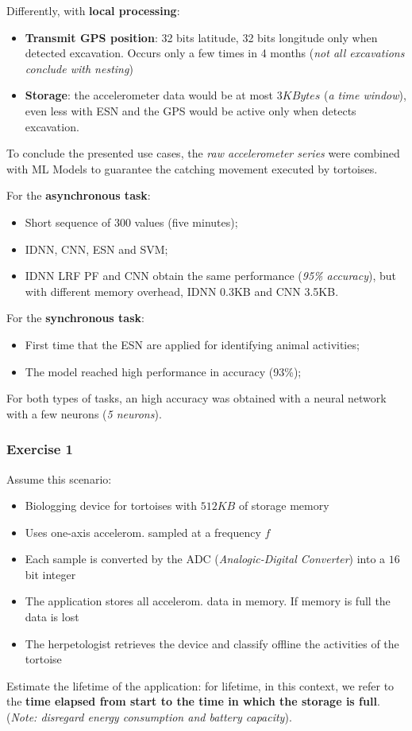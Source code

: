 \documentclass[10pt,a4paper]{report}
\theoremstyle{definition}
\begin{document}
Differently, with \textbf{local processing}:
\begin{itemize}
	\item 
	\textbf{Transmit GPS position}: 32 bits latitude, 32 bits longitude only when detected excavation. Occurs only a few times in 4 months (\textit{not all excavations conclude with nesting})
	\item 
	\textbf{Storage}: the accelerometer data would be at most $3 KBytes$ (\textit{a time window}), even less with ESN and the GPS would be active only when detects excavation.
\end{itemize}

To conclude the presented use cases, the \textit{raw accelerometer series} were combined with ML Models to guarantee the catching movement executed by tortoises.

For the \textbf{asynchronous task}:
\begin{itemize}
	\item 
	Short sequence of 300 values (five minutes);
	\item 
	IDNN, CNN, ESN and SVM;
	\item 
	IDNN LRF PF and CNN obtain the same performance (\textit{95\% accuracy}), but with different memory overhead, IDNN 0.3KB and CNN 3.5KB.
\end{itemize}

For the \textbf{synchronous task}:
\begin{itemize}
	\item 
	First time that the ESN are applied for identifying animal activities;
	\item 
	The model reached high performance in accuracy (93\%);
\end{itemize}

For both types of tasks, an high accuracy was obtained with a neural network with a few neurons (\textit{5 neurons}).

\subsubsection{Exercise 1}\label{sec:exercise-1}
Assume this scenario:
\begin{itemize}
	\item 
	Biologging device for tortoises with $512 KB$ of storage memory
	\item 
	Uses one-axis accelerom. sampled at a frequency $f$
	\item 
	Each sample is converted by the ADC (\textit{Analogic-Digital Converter}) into a $16$ bit integer
	\item 
	The application stores all accelerom. data in memory. If memory is full the data is lost
	\item 
	The herpetologist retrieves the device and classify offline the activities of the tortoise
	
\end{itemize}
Estimate the lifetime of the application: for lifetime, in this context, we refer to the \textbf{time elapsed from start to the time in which the storage is full}. (\textit{Note: disregard energy consumption and battery capacity}).
\end{document}
